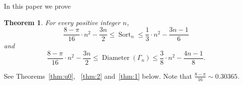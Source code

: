 \documentclass[11pt]{amsart}
\newtheorem{theorem}{Theorem}[section]
\numberwithin{equation}{section}
\newcommand{\todo}[1]{\vspace{5 mm}\par \noindent
\marginpar{\textsc{ToDo}} \framebox{\begin{minipage}[c]{0.95
\textwidth}
 #1 \end{minipage}}\vspace{5 mm}\par}
\newcommand{\D}{{\operatorname{Diameter}}}
\newcommand{\Sort}{{\operatorname{Sort}}}
\begin{document}
In this paper we prove
\begin{theorem}\label{thm:main1}
    For every positive integer $n$, 
    \[
         \frac{8-\pi}{16}\cdot n^2 - \frac{3n}{2} %
        \le \Sort_n  
        \le \frac{1}{3}\cdot n^2 - \frac{3n-1}{6} %
    \]
    and
    \[
         \frac{8-\pi}{16}\cdot n^2 - \frac{3n}{2} %
        \le \D(\Gamma_n)
         \le \frac{3}{8}\cdot n^2 - \frac{4n-1}{8}. %
    \]     
\end{theorem}




See Theorems~\ref{thm:u0}, ~\ref{thm:2} and~\ref{thm:1} below.
Note that $\frac{8 - \pi}{16} \sim 0.30365$.
\end{document}
